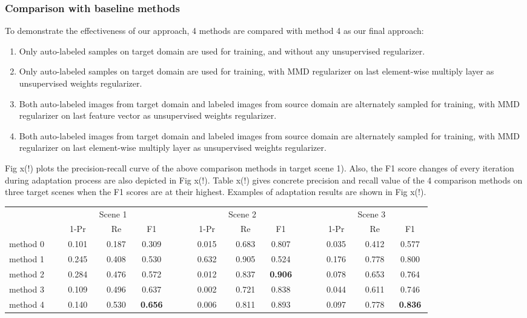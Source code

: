 \documentclass[runningheads]{llncs}
\begin{document}
\subsubsection{Comparison with baseline methods}
To demonstrate the effectiveness of our approach, 4 methods are compared with method 4 as our final approach:
\begin{enumerate}
\item Only auto-labeled samples on target domain are used for training, and without any unsupervised regularizer.
\item Only auto-labeled samples on target domain are used for training, with MMD regularizer on last element-wise multiply layer as unsupervised weights regularizer.
\item Both auto-labeled images from target domain and labeled images from source domain are alternately sampled for training, with MMD regularizer on last feature vector as unsupervised weights regularizer.
\item Both auto-labeled images from target domain and labeled images from source domain are alternately sampled for training, with MMD regularizer on last element-wise multiply layer as unsupervised weights regularizer.
\end{enumerate}
Fig x(!) plots the precision-recall curve of the above comparison methods in target scene 1). Also, the F1 score changes of every iteration during adaptation process are also depicted in Fig x(!). Table x(!) gives concrete precision and recall value of the 4 comparison methods on three target scenes when the F1 scores are at their highest. Examples of adaptation results are shown in Fig x(!).

\begin{table}
\centering
\begin{tabular}{l  c c c c c c c c c c c}
  \hline
    &   \multicolumn{3}{c}{Scene 1}   & & \multicolumn{3}{c}{Scene 2} & &  \multicolumn{3}{c}{Scene 3}   \\
   \cline{2-4} \cline{6-8} \cline{10-12}
    & ~~1-Pr~~ & ~~Re~~ & ~~F1~~ & & ~~1-Pr~~ & ~~Re~~ & ~~F1~~ & & ~~1-Pr~~ & ~~Re~~ & ~~F1~~\\
  \hline
  method 0~~ & 0.101 & 0.187 & 0.309 & ~~ & 0.015 & 0.683 & 0.807 & ~~ & 0.035 & 0.412 & 0.577 \\
  method 1~~ & 0.245 & 0.408 & 0.530 & ~~ & 0.632 & 0.905 & 0.524 & ~~ & 0.176 & 0.778 & 0.800 \\
  method 2~~ & 0.284 & 0.476 & 0.572 & ~~ & 0.012 & 0.837 & {\bf 0.906} & ~~ & 0.078 & 0.653 & 0.764 \\
  method 3~~ & 0.109 & 0.496 & 0.637 & ~~ & 0.002 & 0.721 & 0.838 & ~~ & 0.044 & 0.611 & 0.746 \\
  method 4~~ & 0.140 & 0.530 & {\bf 0.656} & ~~ & 0.006 & 0.811 & 0.893 & ~~ & 0.097 & 0.778 & {\bf 0.836} \\
  \hline
\end{tabular}
\end{table}
\end{document}
